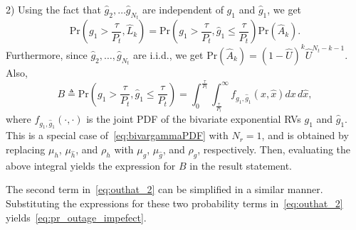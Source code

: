 \documentclass[journal]{IEEEtran}
\newcommand{\brac}[1]{\left({#1}\right)}
\newcommand{\define}{\triangleq}
\newcommand{\prob}[1]{\text{Pr}\brac{#1}}
\newcommand{\setA}{A}
\newcommand{\setAkhat}{\widehat{\setA}_k}
\newcommand{\setL}{L}
\newcommand{\setLkhat}{\widehat{\setL}_k}
\newcommand{\mug}{{\mu_{g}}}
\newcommand{\muh}{{\mu_{h}}}
\newcommand{\Nt}{{N_t}}
\newcommand{\Nr}{{N_r}}
\newcommand{\Pt}{{P_t}}
\newcommand{\such}{h}
\newcommand{\puch}{g}
\newcommand{\gk}[1]{{\puch_{#1}}}
\newcommand{\itau}{\tau}
\newcommand{\taubypt}{\frac{\itau}{\Pt}}
\newcommand{\gkgrtaubypt}[1]{{\gk{#1}}>\taubypt}
\newcommand{\gkhatlttaubypt}[1]{{\gkhat{#1}}\leq\taubypt}
\newcommand{\un}{U}
\newcommand{\unhat}{\widehat{\un}}
\newcommand{\hhat}{\hat{\such}}
\newcommand{\ghat}{\hat{\puch}}
\newcommand{\gkhat}[1]{\ghat_{#1}}
\newcommand{\muhhat}{\mu_{\hhat}}
\newcommand{\mughat}{\mu_{\ghat}}
\newcommand{\Probglt}{B}
\newcommand{\rhog}{\rho_g}
\newcommand{\rhoh}{\rho_h}
\newcommand{\xhat}{\hat{x}}
\begin{document}
2) Using the fact that $\gkhat{2},\ldots\gkhat{\Nt}$ are independent of $\gk{1}$ and $\gkhat{1}$, we get  
%
\begin{equation}
\prob{\gkgrtaubypt{1},\setLkhat} =\prob{\gkgrtaubypt{1},\gkhatlttaubypt{1}}\prob{\setAkhat}. 
\end{equation}
%
Furthermore, since $\gkhat{2},\ldots,\gkhat{\Nt}$ are i.i.d., we get $\prob{\setAkhat}=\left(1- \unhat \right)^{k} \unhat^{\Nt-k-1}$. Also,
\begin{equation}
\label{eq:g1_integral}
\Probglt\define\prob{\!\gkgrtaubypt{1}\!,\gkhatlttaubypt{1}\!}\!\!=\!\!\int_{0}^{\taubypt}\!\!\!\int_{\taubypt}^{\infty}\!\!f_{\gk{1},\gkhat{1}}\!\left(x,\xhat \right)dx\, d\xhat,
\end{equation}
where $f_{\gk{1},\gkhat{1}}\left(\cdot,\cdot \right)$ is the joint PDF of the bivariate exponential RVs $\gk{1}$ and $\gkhat{1}$.  This is a special case of~\eqref{eq:bivargammaPDF} with $\Nr=1$, and is obtained by replacing $\muh$, $\muhhat$, and $\rhoh$ with $\mug$, $\mughat$, and $\rhog$, respectively. Then, evaluating the above integral yields the expression for $\Probglt$ in the result statement.


The second term in~\eqref{eq:outhat_2} can be simplified in a similar manner. Substituting the expressions for these two probability terms in~\eqref{eq:outhat_2} yields~\eqref{eq:pr_outage_impefect}.
 
\end{document}
